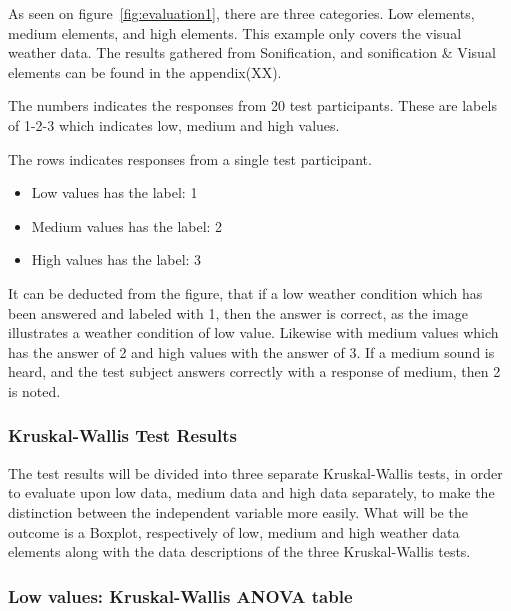 As seen on figure~\ref{fig:evaluation1}, there are three categories. 
Low elements, medium elements, and high elements. 
This example only covers the visual weather data. 
The results gathered from Sonification, and sonification \& Visual elements can be found in the appendix(XX).


The numbers indicates the responses from 20 test participants. 
These are labels of 1-2-3 which indicates low, medium and high values.

The rows indicates responses from a single test participant.

\begin{itemize}
    \item Low values has the label: 1
    \item Medium values has the label: 2
    \item High values has the label: 3
\end{itemize}

It can be deducted from the figure, that if a low weather condition which has been answered and labeled with 1, then the answer is correct, as the image illustrates a weather condition of low value. 
Likewise with medium values which has the answer of 2 and high values with the answer of 3. 
If a medium sound is heard, and the test subject answers correctly with a response of medium, then 2 is noted.

\subsubsection{Kruskal-Wallis Test Results} %
\label{ssub:kruskal_wallis_test_results}

The test results will be divided into three separate Kruskal-Wallis tests, in order to evaluate upon low data, medium data and high data separately, to make the distinction between the independent variable more easily. 
What will be the outcome is a Boxplot, respectively of low, medium and high weather data elements along with the data descriptions of the three Kruskal-Wallis tests. 


\subsubsection*{Low values: Kruskal-Wallis ANOVA table} %
\label{ssub:low_values_kruskal_wallis_anova_table}

